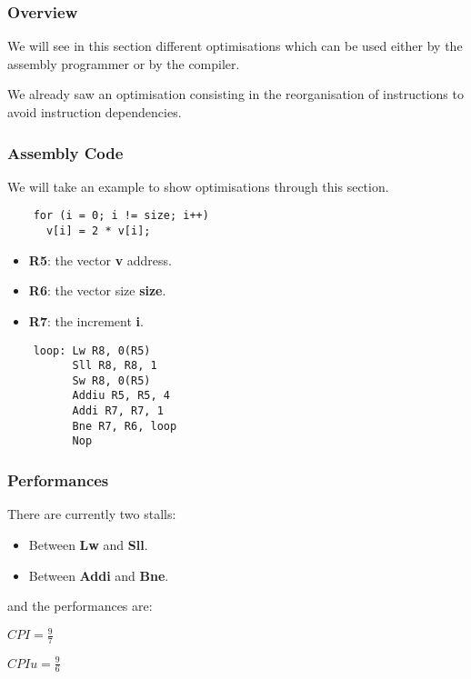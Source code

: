 
\begin{frame}
  \frametitle{Overview}

  We will see in this section different optimisations which can be
  used either by the assembly programmer or by the compiler.

  \-

  We already saw an optimisation consisting in the reorganisation
  of instructions to avoid instruction dependencies.
\end{frame}


\begin{frame}[containsverbatim]
  \frametitle{Assembly Code}

  We will take an example to show optimisations through this section.

  \begin{verbatim}
    for (i = 0; i != size; i++)
      v[i] = 2 * v[i];
  \end{verbatim}

  \begin{itemize}
    \item
      \textbf{R5}: the vector \textbf{v} address.
    \item
      \textbf{R6}: the vector size \textbf{size}.
    \item
      \textbf{R7}: the increment \textbf{i}.
  \end{itemize}

  \begin{verbatim}
    loop: Lw R8, 0(R5)
          Sll R8, R8, 1
          Sw R8, 0(R5)
          Addiu R5, R5, 4
          Addi R7, R7, 1
          Bne R7, R6, loop
          Nop
  \end{verbatim}
\end{frame}


\begin{frame}
  \frametitle{Performances}

  There are currently two stalls:

  \begin{itemize}
    \item
      Between \textbf{Lw} and \textbf{Sll}.
    \item
      Between \textbf{Addi} and \textbf{Bne}.
  \end{itemize}

  and the performances are:

  \-

  $CPI = \frac{9}{7}$

  $CPIu = \frac{9}{6}$
\end{frame}

